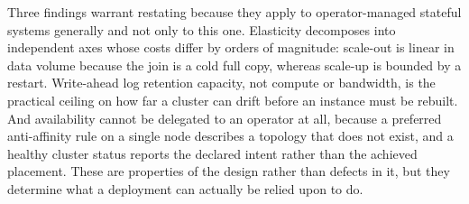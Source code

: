 \documentclass[11pt,a4paper]{article}
\begin{document}
Three findings warrant restating because they apply to operator-managed stateful systems generally and not only to this one. Elasticity decomposes into independent axes whose costs differ by orders of magnitude: scale-out is linear in data volume because the join is a cold full copy, whereas scale-up is bounded by a restart. Write-ahead log retention capacity, not compute or bandwidth, is the practical ceiling on how far a cluster can drift before an instance must be rebuilt. And availability cannot be delegated to an operator at all, because a preferred anti-affinity rule on a single node describes a topology that does not exist, and a healthy cluster status reports the declared intent rather than the achieved placement. These are properties of the design rather than defects in it, but they determine what a deployment can actually be relied upon to do.
\end{document}
